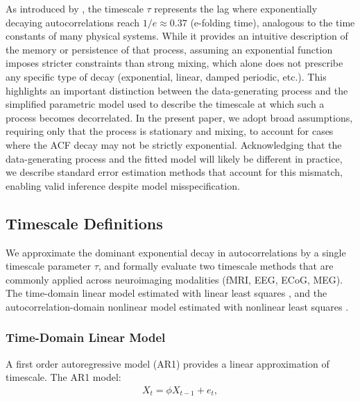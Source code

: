\documentclass[docs/main.tex]{subfiles}
\begin{document}
As introduced by \citet{murray_hierarchy_2014}, the timescale $\tau$ represents the lag where exponentially decaying autocorrelations reach $1/e \approx 0.37$ (e-folding time), analogous to the time constants of many physical systems. While it provides an intuitive description of the memory or persistence of that process, assuming an exponential function imposes stricter constraints than strong mixing, which alone does not prescribe any specific type of decay (exponential, linear, damped periodic, etc.). This highlights an important distinction between the data-generating process and the simplified parametric model used to describe the timescale at which such a process becomes decorrelated. In the present paper, we adopt broad assumptions, requiring only that the process is stationary and mixing, to account for cases where the ACF decay may not be strictly exponential. Acknowledging that the data-generating process and the fitted model will likely be different in practice, we describe standard error estimation methods that account for this mismatch, enabling valid inference despite model misspecification.

\subsection{Timescale Definitions}
We approximate the dominant exponential decay in autocorrelations by a single timescale parameter $\tau$, and formally evaluate two timescale methods that are commonly applied across neuroimaging modalities (fMRI, EEG, ECoG, MEG). The time-domain linear model estimated with linear least squares \citep{kaneoke_variance_2012, meisel_decline_2017, huang_timescales_2018, lurie_cortical_2024, shinn_functional_2023, shafiei_topographic_2020}, and the autocorrelation-domain nonlinear model estimated with nonlinear least squares \citep{rossi-pool_invariant_2021, cirillo_neural_2018, ito_cortical_2020, runyan_distinct_2017, zeraati_flexible_2022, nougaret_intrinsic_2021, wasmuht_intrinsic_2018, muller_core_2020, maisson_choice-relevant_2021, li_hierarchical_2022, shafiei_topographic_2020}.


\subsubsection{Time-Domain Linear Model}\label{sec:time-domain-linear-model}
A first order autoregressive model (AR1) provides a linear approximation of timescale. The AR1 model:
\begin{align}\label{eq:ar1}
    X_t = \phi X_{t-1} + e_t,
\end{align}
\end{document}
